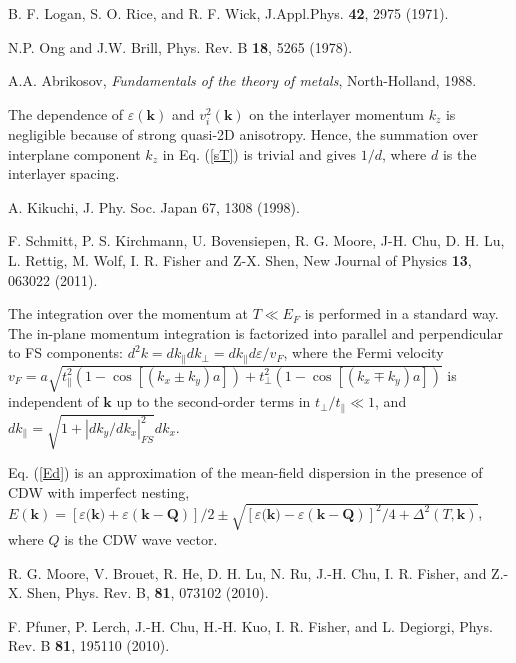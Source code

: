 \begin{thebibliography}{99}
 B. F. Logan, S. O. Rice, and R. F. Wick, J.Appl.Phys.
\textbf{42}, 2975 (1971).

 N.P. Ong and J.W. Brill, Phys. Rev. B \textbf{18}, 5265
(1978).

 A.A. Abrikosov, \textit{Fundamentals of the theory of metals}, North-Holland, 1988.

 The dependence of $\varepsilon \left( \boldsymbol{k}
\right) $ and $v_{i}^{2}\left( \boldsymbol{k}\right) $ on the
interlayer momentum $k_{z}$ is negligible because of strong quasi-2D
anisotropy. Hence, the summation over interplane component $k_{z}$
in Eq. (\ref{sT}) is trivial and gives $1/d$, where $d$ is the
interlayer spacing.

 A. Kikuchi, J. Phy. Soc. Japan 67, 1308 (1998).

 F. Schmitt, P. S. Kirchmann, U. Bovensiepen, R. G. Moore, J-H.
Chu, D. H. Lu, L. Rettig, M. Wolf, I. R. Fisher and Z-X. Shen, New
Journal of Physics \textbf{13}, 063022 (2011).

 The integration over the momentum at $T\ll E_{F}$ is
performed in a standard way. The in-plane momentum integration is
factorized into parallel and perpendicular to FS components:
$d^{2}k=dk_{\parallel
}dk_{\perp }=dk_{\parallel }d\varepsilon /v_{F}$, where the Fermi velocity $
v_{F}=a\sqrt{t_{\parallel }^{2}\left( 1-\cos \left[ \left( k_{x}\pm
k_{y}\right) a\right] \right) +t_{\perp }^{2}\left( 1-\cos \left[
\left( k_{x}\mp k_{y}\right) a\right] \right) }$ is independent of
$\boldsymbol{k}$
up to the second-order terms in $t_{\perp }/t_{\parallel }\ll 1$, and $
dk_{\parallel }=\sqrt{1+\left\vert dk_{y}/dk_{x}\right\vert
_{FS}^{2}}dk_{x}$.

 Eq. (\ref{Ed}) is an approximation of the mean-field
dispersion in the presence of CDW with imperfect nesting, $E\left( \mathbf{k}
\right) =\left[ \varepsilon ({\boldsymbol{k)}}+\varepsilon ({\boldsymbol{k}}-
{\boldsymbol{Q}})\right] /2\pm \sqrt{\left[ \varepsilon ({\boldsymbol{k)}}
-\varepsilon ({\boldsymbol{k}}-{\boldsymbol{Q}})\right]
^{2}/4+\Delta ^{2}\left( T,\boldsymbol{k}\right) }$, where $Q$ is
the CDW wave vector.

R. G. Moore, V. Brouet, R. He, D. H. Lu, N. Ru, J.-H. Chu, I. R.
Fisher, and Z.-X. Shen, Phys. Rev. B, \textbf{81}, 073102 (2010).

 F. Pfuner, P. Lerch, J.-H. Chu, H.-H. Kuo, I. R. Fisher,
and L. Degiorgi, Phys. Rev. B \textbf{81}, 195110 (2010).


\end{thebibliography}
